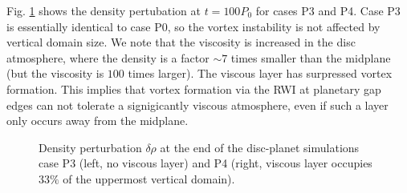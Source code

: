 Fig. \ref{jup0_3h} shows the density pertubation at $t=100P_0$ for
cases P3 and P4. Case P3 is essentially identical to case P0, so the 
vortex instability is not affected by vertical domain size. We note
that the viscosity is increased in the disc atmosphere, where the
density is a factor $\sim 7$ times smaller than the midplane (but the
viscosity is $100$ times larger). The viscous layer has surpressed
vortex formation. This implies that vortex formation via
the RWI at planetary gap edges can not tolerate a signigicantly
viscous atmosphere, even if such a layer only occurs away from the
midplane.    

\begin{figure}
   \centering
   \caption{Density perturbation $\delta\rho$ at the end of the
     disc-planet simulations case P3 (left, no viscous layer) and P4
     (right, viscous layer occupies $33\%$ of the uppermost vertical
     domain).   
     \label{jup0_3h}}
\end{figure}
 


